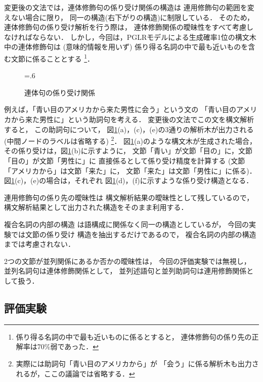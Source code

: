 変更後の文法では，連体修飾句の係り受け関係の構造は
連用修飾句の範囲を変えない場合に限り，
同一の構造(右下がりの構造)に制限している．
そのため，連体修飾句の係り受け解析を行う際は，
連体修飾関係の曖昧性をすべて考慮しなければならない．
しかし，今回は，PGLRモデルによる生成確率1位の構文木中の連体修飾句は
(意味的情報を用いず)
係り得る名詞の中で最も近いものを含む文節に係ることとする
\footnote{係り得る名詞の中で最も近いものに係るとすると，
連体修飾句の係り先の正解率は70\%弱であった．}．

\begin{figure}[t]
  \centering
  \epsfxsize=.6\textwidth
  \caption{連体句の係り受け関係}
  \label{fig:sdda_adn}
\end{figure}

例えば，「青い目のアメリカから来た男性に会う」という文の
「青い目のアメリカから来た男性に」という助詞句を考える．
変更後の文法でこの文を構文解析すると，
この助詞句について，
図\ref{fig:sdda_adn}(a)，(c)，(e)の3通りの解析木が出力される
(中間ノードのラベルは省略する)
\footnote{実際には助詞句「青い目のアメリカから」が
「会う」に係る解析木も出力されるが，ここの議論では省略する．}．
図\ref{fig:sdda_adn}(a)のような構文木が生成された場合，
その係り受けは，図\ref{fig:sdda_adn}(b)に示すように，
文節「青い」が文節「目の」に，文節「目の」が文節「男性に」に
直接係るとして係り受け精度を計算する
(文節「アメリカから」は文節「来た」に，
文節「来た」は文節「男性に」に係る)．
図\ref{fig:sdda_adn}(c)，(e)の場合は，それぞれ
図\ref{fig:sdda_adn}(d)，(f)に示すような係り受け構造となる．

連用修飾句の係り先の曖昧性は
構文解析結果の曖昧性として残しているので，
構文解析結果として出力された構造をそのまま利用する．

複合名詞の内部の構造
は語構成に関係なく同一の構造としているが，
今回の実験では文節の係り受け
構造を抽出するだけであるので，
複合名詞の内部の構造までは考慮されない．

2つの文節が並列関係にあるか否かの曖昧性は，
今回の評価実験では無視し，
並列名詞句は連体修飾関係として，
並列述語句と並列助詞句は連用修飾関係として扱う．

\subsection{評価実験}

